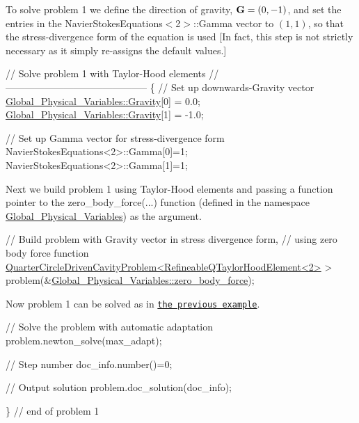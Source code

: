 To solve problem 1 we define the direction of gravity, $ {\bf G} = (0,-1)$, and set the entries in the {\ttfamily Navier\+Stokes\+Equations$<$2$>$\+::\+Gamma} vector to $ (1,1)$, so that the stress-\/divergence form of the equation is used \mbox{[}In fact, this step is not strictly necessary as it simply re-\/assigns the default values.\mbox{]}


\begin{DoxyCodeInclude}

 \textcolor{comment}{// Solve problem 1 with Taylor-Hood elements}
 \textcolor{comment}{//--------------------------------------------}
 \{
  \textcolor{comment}{// Set up downwards-Gravity vector}
  \hyperlink{namespaceGlobal__Physical__Variables_afae321364975eb56688ad13abc8ed6b7}{Global\_Physical\_Variables::Gravity}[0] = 0.0;
  \hyperlink{namespaceGlobal__Physical__Variables_afae321364975eb56688ad13abc8ed6b7}{Global\_Physical\_Variables::Gravity}[1] = -1.0;
  
  \textcolor{comment}{// Set up Gamma vector for stress-divergence form}
  NavierStokesEquations<2>::Gamma[0]=1;
  NavierStokesEquations<2>::Gamma[1]=1;

\end{DoxyCodeInclude}


Next we build problem 1 using Taylor-\/\+Hood elements and passing a function pointer to the {\ttfamily zero\+\_\+body\+\_\+force}(...) function (defined in the namespace {\ttfamily \hyperlink{namespaceGlobal__Physical__Variables}{Global\+\_\+\+Physical\+\_\+\+Variables}}) as the argument.


\begin{DoxyCodeInclude}

  \textcolor{comment}{// Build problem with Gravity vector in stress divergence form, }
  \textcolor{comment}{// using zero body force function}
  \hyperlink{classQuarterCircleDrivenCavityProblem}{QuarterCircleDrivenCavityProblem<RefineableQTaylorHoodElement<2>}
       > 
   problem(&\hyperlink{namespaceGlobal__Physical__Variables_a9780d615ae07c4e00a436ab2973b54e6}{Global\_Physical\_Variables::zero\_body\_force});

\end{DoxyCodeInclude}


Now problem 1 can be solved as in \href{../../adaptive_driven_cavity/html/index.html#main}{\tt the previous example}.


\begin{DoxyCodeInclude}

  \textcolor{comment}{// Solve the problem with automatic adaptation}
  problem.newton\_solve(max\_adapt);
  
  \textcolor{comment}{// Step number}
  doc\_info.number()=0;

  \textcolor{comment}{// Output solution}
  problem.doc\_solution(doc\_info);  

 \} \textcolor{comment}{// end of problem 1}

\end{DoxyCodeInclude}






